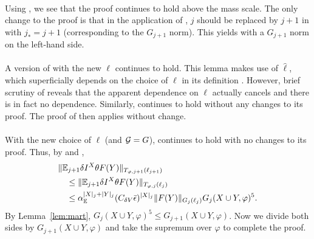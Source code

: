 \paragraph{\cite[Proposition~\ref{IE-prop:hldg}]{BS-rg-IE}}
Using , we see that the proof
continues to hold
above the mass scale.
The only change to the proof is that in the application of
\cite[Proposition~\ref{IE-prop:Istab}]{BS-rg-IE}, $j$ should be replaced by
$j + 1$ in \cite[\eqref{IE-e:IF}]{BS-rg-IE} with $j_* = j + 1$ (corresponding
to the $G_{j+1}$ norm). This yields \cite[\eqref{IE-e:2Lprimeh1}]{BS-rg-IE}
with a $G_{j+1}$ norm on the left-hand side.

\paragraph{\cite[Proposition~\ref{IE-prop:h}]{BS-rg-IE}}
A version of \cite[Lemma~\ref{IE-lem:dIipV}]{BS-rg-IE} with the new $\ell$
continues to hold. This lemma makes use of $\hat\ell$,
which superficially depends on the choice of $\ell$ in its definition
\cite[\eqref{IE-e:ellhatdef}]{BS-rg-IE}. However, brief scrutiny of
\cite[\eqref{IE-e:ellhatdef}]{BS-rg-IE} reveals that
the apparent dependence on $\ell$ actually cancels and there is in fact no dependence.
Similarly,
\cite[Lemma~\ref{IE-lem:epdV}]{BS-rg-IE} continues to hold without
any changes to its proof.
The proof of \cite[Proposition~\ref{IE-prop:h}]{BS-rg-IE} then applies without change.

\paragraph{\cite[Proposition~\ref{IE-prop:ip}]{BS-rg-IE}}
With the new choice of $\ell$ (and $\mathcal{G} = G$),
\cite[Lemma~\ref{IE-lem:dIip}]{BS-rg-IE} continues to hold with no changes to its proof.
Thus, by \cite[\eqref{IE-e:scale-change}]{BS-rg-IE}
and \cite[Lemma~\ref{IE-lem:dIip}]{BS-rg-IE},
\begin{align}
  \label{e:integration-property-pf}
     &\|\mathbb{E}_{j+1} \delta I^X \theta F(Y) \|_{T_{\varphi,j+1}(\ell_{j+1})}
     \nonumber \\
     &\quad \leq
     \|\mathbb{E}_{j+1} \delta I^X \theta F(Y) \|_{T_{\varphi,j}(\ell_{j})} \nonumber \\
     &\quad \leq
     \alpha_{{\mathbb E}}^{|X|_j+|Y|_j}
     (C_{\delta V} \bar{\epsilon})^{|X|_j}
     \| F(Y) \|_{G_j(\ell_{j})}
    G_j(X\cup Y,\varphi)^5
    .
\end{align}
By Lemma~\ref{lem:mart}, $G_j(X\cup Y,\varphi)^5 \le G_{j+1}(X\cup Y,\varphi)$.
Now we divide both sides by
$G_{j+1}(X \cup Y, \varphi)$ and take the supremum over $\varphi$ to complete the proof.

